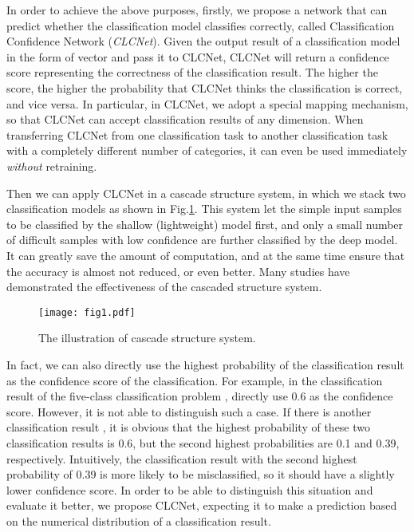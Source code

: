 \documentclass{article}
\begin{document}
In order to achieve the above purposes, firstly, we propose a network that can predict whether the classification model classifies correctly, called Classification Confidence Network (\emph{CLCNet}). Given the output result of a classification model in the form of vector and pass it to CLCNet, CLCNet will return a confidence score representing the correctness of the classification result. The higher the score, the higher the probability that CLCNet thinks the classification is correct, and vice versa. In particular, in CLCNet, we adopt a special mapping mechanism, so that CLCNet can accept classification results of any dimension. When transferring CLCNet from one classification task to another classification task with a completely different number of categories, it can even be used immediately \emph{without} retraining.




Then we can apply CLCNet in a cascade structure system, in which we stack two classification models as shown in Fig.\ref{fig1}. This system let the simple input samples to be classified by the shallow (lightweight) model first, and only a small number of difficult samples with low confidence are further classified by the deep model. It can greatly save the amount of computation, and at the same time ensure that the accuracy is almost not reduced, or even better. Many studies \cite{wang2017idk,enomoro2021learning,wan2018confnet} have demonstrated the effectiveness of the cascaded structure system.

\begin{figure}
  \vspace{-0em}  
  \centering
  \texttt{[image: fig1.pdf]}
  \caption{The illustration of cascade structure system.}
  \label{fig1}
  \vspace{-1em}  \end{figure}
In fact, we can also directly use the highest probability of the classification result as the confidence score of the classification. For example, in the classification result of the five-class classification problem , directly use 0.6 as the confidence score. However, it is not able to distinguish such a case. If there is another classification result , it is obvious that the highest probability of these two classification results is 0.6, but the second highest probabilities are 0.1 and 0.39, respectively. Intuitively, the classification result with the second highest probability of 0.39 is more likely to be misclassified, so it should have a slightly lower confidence score. In order to be able to distinguish this situation and evaluate it better, we propose CLCNet, expecting it to make a prediction based on the numerical distribution of a classification result.
\end{document}
